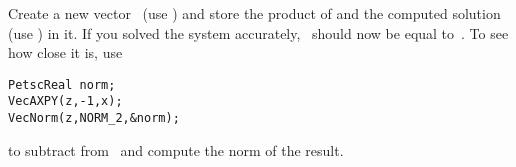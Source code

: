   Create a new vector~ (use ) and store the
  product of  and the computed solution~ (use )
  in it. If you solved the system accurately, ~should now be
  equal to~. To see how close it is, use
\begin{verbatim}
PetscReal norm;
VecAXPY(z,-1,x);
VecNorm(z,NORM_2,&norm);
\end{verbatim}
  to subtract  from~ and compute the norm of the result.
